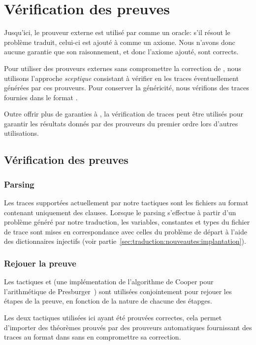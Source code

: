 \section{Vérification des preuves \tff}
\label{sec:traces}

Jusqu'ici, le prouveur externe est utilisé par \holfour comme un
oracle: s'il résout le problème traduit, celui-ci est ajouté à \holfour
comme un axiome. Nous n'avons donc aucune garantie que son raisonnement,
et donc l'axiome ajouté, sont corrects.

Pour utiliser des prouveurs externes sans compromettre la correction de
\holfour, nous utilisons l'approche \emph{sceptique} consistant à
vérifier en \holfour les traces éventuellement générées par ces
prouveurs. Pour conserver la généricité, nous vérifions des traces
fournies dans le format \tff.

Outre offrir plus de garanties à \holfour, la vérification de traces
\tff peut être utilisés pour garantir les résultats donnés par des
prouveurs du premier ordre lors d'autres utilisations.


\subsection{Vérification des preuves}
\subsubsection{Parsing}
Les traces supportées actuellement par notre tactiques sont les fichiers
au format \tff contenant uniquement des clauses. Lorsque le parsing
s'effectue à partir d'un problème généré par notre traduction, les
variables, constantes et types du fichier de trace sont mises en
correspondance avec celles du problème de départ à l'aide des
dictionnaires injectifs \holfour (voir
partie~\ref{sec:traduction:nouveautes:implantation}).


\subsubsection{Rejouer la preuve}

Les tactiques \metistac et \coopertac (une implémentation de
l'algorithme de Cooper pour l'arithmétique de
Presburger~\cite{Norrish03completeinteger}) sont utilisées conjointement
pour rejouer les étapes de la preuve, en fonction de la nature de
chacune des étapges.

Les deux tactiques utilisées ici ayant été prouvées correctes, cela
permet d'importer des théorèmes prouvés par des prouveurs automatiques
fournissant des traces au format \tff dans \holfour sans en compromettre
sa correction.

